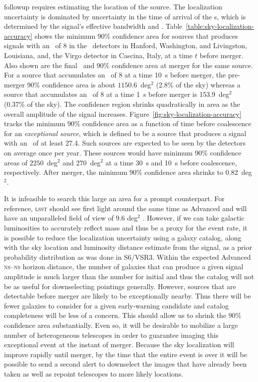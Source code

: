 \EM{} followup requires estimating the location of the \GW{} source. The
localization uncertainty is dominated by uncertainty in the time of arrival of
the \GW{}s, which is determined by the signal's effective bandwidth and \SNR{}
\citep{Fairhurst2009}.  Table~\ref{table:sky-localization-accuracy} shows the
minimum 90\% confidence area for sources that produces signals with an \SNR\ of
8 in the \LIGO\ detectors in Hanford, Washington, and Livingston, Louisiana,
and, the Virgo detector in Cascina, Italy, at a time $t$ before merger.  Also
shown are the final \SNR\ and 90\% confidence area at merger for the same
source.  For a source that accumulates an \SNR\ of 8 at a time 10~s before
merger, the pre-merger 90\% confidence area is about $1150.6$~deg$^2$ (2.8\% of
the sky) whereas a source that accumulates an \SNR\ of 8 at a time 1~s before
merger is 153.9~deg$^2$ (0.37\% of the sky).  The confidence region shrinks
quadratically in area as the overall amplitude of the signal increases.
Figure~\ref{fig:sky-localization-accuracy} tracks the minimum 90\% confidence
area as a function of time before coalescence for an \emph{exceptional source},
which is defined to be a source that produces a signal with an \SNR\ of at
least 27.4. Such sources are expected to be seen by the detectors on average
once per year. These sources would have minimum 90\% confidence areas of
$2250$~deg$^2$ and $270$~deg$^2$ at a time 30~s and 10~s before coalescence,
respectively.  After merger, the minimum 90\% confidence area shrinks to
$0.82$~deg$^2$.

It is infeasible to search this large an area for a prompt counterpart. For
reference, \textsc{lsst} should see first light around the same time as
Advanced \LIGO{} and will have an unparalleled field of view of 9.6 deg$^2$
\citep{2008arXiv0805.2366I}.  However, if we can take galactic luminosities
to accurately reflect mass and thus be a proxy for the \CBC{} event rate, it is
possible to reduce the localization uncertainty using a galaxy catalog, along
with the sky location and luminosity distance estimate from the \GW{} signal,
as a prior probability distribution \citep{galaxy-catalog} as was done in
S6/VSR3. Within the expected Advanced \LIGO{} \textsc{ns}--\textsc{ns} horizon
distance, the number of galaxies that can produce a given signal
amplitude is much larger than the number for initial \LIGO{} and thus the
catalog will not be as useful for downselecting pointings generally. However,
sources that are detectable before merger are likely to be exceptionally
nearby. Thus there will be fewer galaxies to consider for a given
early-warning candidate and catalog completeness will be less of a concern.
This should allow us to shrink the 90\% confidence area substantially.
Even so, it will be desirable to mobilize a large number of heterogeneous
telescopes in order to guarantee imaging this exceptional event at the instant
of merger. Because the sky localization will improve rapidly until merger,
by the time that the entire \CBC{} event is over it will be
possible to send a second alert to downselect the images that have already been
taken as well as repoint telescopes to more likely locations.

